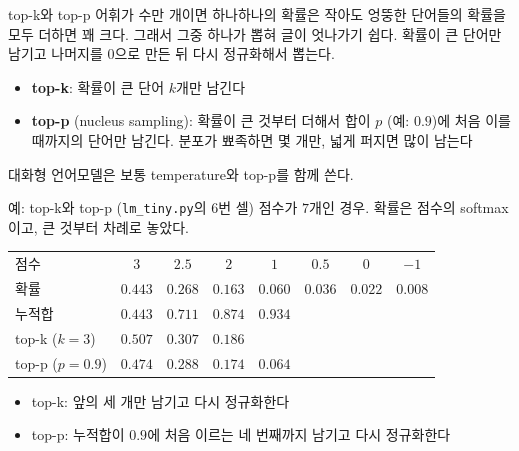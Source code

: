 \documentclass[aspectratio=169,11pt]{beamer}
\begin{document}
\begin{frame}{top-k와 top-p}
어휘가 수만 개이면 하나하나의 확률은 작아도 엉뚱한 단어들의 확률을 모두 더하면 꽤 크다.
그래서 그중 하나가 뽑혀 글이 엇나가기 쉽다.
확률이 큰 단어만 남기고 나머지를 $0$으로 만든 뒤 다시 정규화해서 뽑는다.
\begin{itemize}
\item \textbf{top-k}: 확률이 큰 단어 $k$개만 남긴다
\item \textbf{top-p} (nucleus sampling): 확률이 큰 것부터 더해서 합이 $p$ (예: $0.9$)에 처음 이를 때까지의
단어만 남긴다. 분포가 뾰족하면 몇 개만, 넓게 퍼지면 많이 남는다
\end{itemize}
\vskip2mm
\begin{keybox}
대화형 언어모델은 보통 temperature와 top-p를 함께 쓴다.
\end{keybox}
\end{frame}

\begin{frame}{예: top-k와 top-p (\texttt{lm\_tiny.py}의 6번 셀)}
점수가 $7$개인 경우. 확률은 점수의 softmax이고, 큰 것부터 차례로 놓았다.
\vskip3mm
\centering
\begin{tabular}{@{}lccccccc@{}}
\toprule
점수 & $3$ & $2.5$ & $2$ & $1$ & $0.5$ & $0$ & $-1$ \\
확률 & $0.443$ & $0.268$ & $0.163$ & $0.060$ & $0.036$ & $0.022$ & $0.008$ \\
누적합 & $0.443$ & $0.711$ & $0.874$ & $0.934$ & & & \\
\midrule
top-k ($k=3$) & $0.507$ & $0.307$ & $0.186$ & & & & \\
top-p ($p=0.9$) & $0.474$ & $0.288$ & $0.174$ & $0.064$ & & & \\
\bottomrule
\end{tabular}
\vskip3mm
\raggedright
\begin{itemize}
\item top-k: 앞의 세 개만 남기고 다시 정규화한다
\item top-p: 누적합이 $0.9$에 처음 이르는 네 번째까지 남기고 다시 정규화한다
\end{itemize}
\end{frame}
\end{document}
